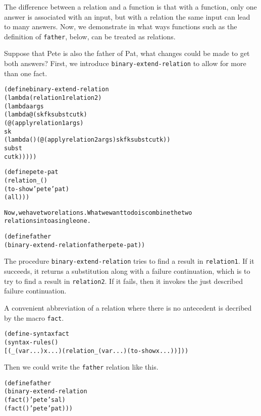 The difference between a relation and a function is that with a
function, only one answer is associated with an input, but with a
relation the same input can lead to many answers.  Now, we demonstrate
in what ways functions such as the definition of \texttt{father},
below, can be treated as relations.

Suppose that Pete is also the father of Pat, what changes could be
made to get both answers?  First, we introduce
\texttt{binary-extend-relation} to allow for more than one fact.

\begin{alltt}
(define binary-extend-relation
  (lambda (relation1 relation2)
    (lambda args
      (lambda@ (sk fk subst cutk)
        (@ (apply relation1 args)
           sk
           (lambda () (@ (apply relation2 args) sk fk subst cutk))
           subst
           cutk)))))

\begin{alltt}
(define pete-pat
  (relation _ ()
    (to-show 'pete 'pat)
    (all)))
\end{alltt}

Now, we have two relations.  What we want to do is combine the two
relations into a single one.  

(define father
  (binary-extend-relation father pete-pat))
\end{alltt}

The procedure \texttt{binary-extend-relation} tries to find a result
in \texttt{relation1}.  If it succeeds, it returns a substitution
along with a failure continuation, which is to try to find a result in
\texttt{relation2}.  If it fails, then it invokes the just described
failure continuation.

A convenient abbreviation of a relation where there is no antecedent
is decribed by the macro \texttt{fact}.

\begin{alltt}
(define-syntax fact
  (syntax-rules ()
    [(_ (var ...) x ...) (relation _ (var ...) (to-show x ...))]))
\end{alltt}

Then we could write the \texttt{father} relation like this.

\begin{alltt}
(define father
  (binary-extend-relation
    (fact () 'pete 'sal)
    (fact () 'pete 'pat)))
\end{alltt}

